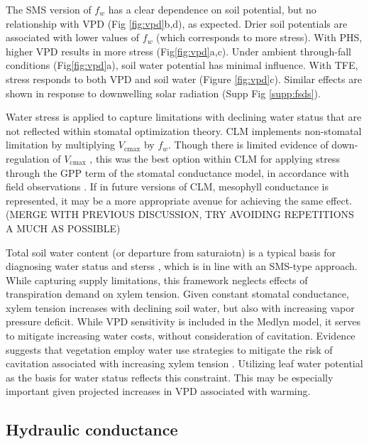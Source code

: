 \documentclass[draft,linenumbers]{agujournal}
\begin{document}
    The SMS version of $f_w$ has a clear dependence on soil potential, but no relationship with VPD (Fig \ref{fig:vpd}b,d), as expected. 
    Drier soil potentials are associated with lower values of $f_w$ (which corresponds to more stress).
    With PHS, higher VPD results in more stress (Fig\ref{fig:vpd}a,c).
    Under ambient through-fall conditions (Fig\ref{fig:vpd}a), soil water potential has minimal influence.
    With TFE, stress responds to both VPD and soil water (Figure \ref{fig:vpd}c).
    Similar effects are shown in response to downwelling solar radiation (Supp Fig \ref{supp:fsds}).
    
    Water stress is applied to capture limitations with declining water status that are not reflected within stomatal optimization theory.
    CLM implements non-stomatal limitation by multiplying $V_{\text{cmax}}$ by $f_w$.
    Though there is limited evidence of down-regulation of $V_{\text{cmax}}$ \citep{flexas2006}, this was the best option within CLM 
    for applying stress through the GPP term of the stomatal conductance model, in accordance with field observations \citep{lin2018,zhou2013}.
    If in future versions of CLM, mesophyll conductance is represented, it may be a more appropriate avenue for achieving the same effect. (MERGE WITH PREVIOUS DISCUSSION, TRY AVOIDING REPETITIONS A MUCH AS POSSIBLE)
    
    Total soil water content (or departure from saturaiotn) is a typical basis for diagnosing water status and sterss \citep{drake2017}, which is in line with an SMS-type approach.
    While capturing supply limitations, this framework neglects effects of transpiration demand on xylem tension.
    Given constant stomatal conductance, xylem tension increases with declining soil water, but also with increasing vapor pressure deficit.
    While VPD sensitivity is included in the Medlyn model, it serves to mitigate increasing water costs, without consideration of cavitation.
    Evidence suggests that vegetation employ water use strategies to mitigate the risk of cavitation associated with increasing xylem tension \citep{sperry1998,fisher2006,choat2012}.
    Utilizing leaf water potential as the basis for water status reflects this constraint.
    This may be especially important given projected increases in VPD associated with warming.

\subsection{Hydraulic conductance}
\end{document}
